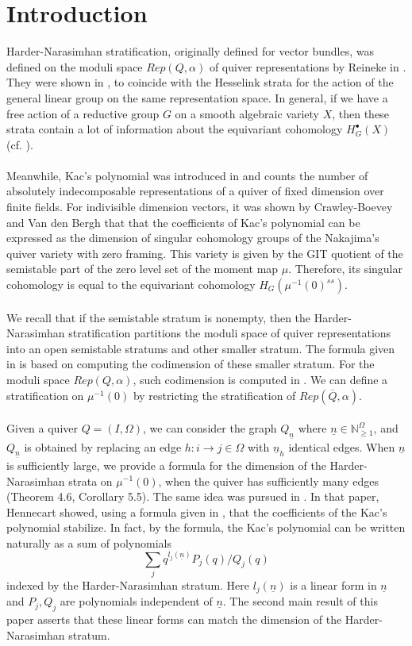 \documentclass[12pt]{amsart}
\theoremstyle{plain}
\theoremstyle{definition}
\theoremstyle{remark}
\begin{document}
\section{Introduction}
\hspace{-12pt}Harder-Narasimhan stratification, originally defined for vector bundles, was defined on the moduli space $Rep(Q,\alpha)$ of quiver representations by Reineke in \cite{reineke2003hn}. They were shown in \cite{hoskins2014stratifications},\cite{hoskins2018stratifications} to coincide with the Hesselink strata for the action of the general linear group on the same representation space. In general, if we have a free action of a reductive group $G$ on a smooth algebraic variety $X$, then these strata contain a lot of information about the equivariant cohomology $H_G^{\bullet}(X)$ (cf. \cite{kirwan1984cohomology}). 
\\~\\ Meanwhile, Kac's polynomial was introduced in \cite{kac1983root} and counts the number of absolutely indecomposable representations of a quiver of fixed dimension over finite fields. For indivisible dimension vectors, it was shown by Crawley-Boevey and Van den Bergh that \cite{crawley2004absolutely} that the coefficients of Kac's polynomial can be expressed as the dimension of singular cohomology groups of the Nakajima's quiver variety with zero framing. This variety is given by the GIT quotient of the semistable part of the zero level set of the moment map $\mu$. Therefore, its singular cohomology is equal to the equivariant cohomology $H_G(\mu^{-1}(0)^{ss})$. 
\\~\\ We recall that if the semistable stratum is nonempty, then the Harder-Narasimhan stratification partitions the moduli space of quiver representations into an open semistable stratums and other smaller stratum. The formula given in \cite{kirwan1984cohomology} is based on computing the codimension of these smaller stratum. For the moduli space $Rep(Q,\alpha)$, such codimension is computed in \cite{reineke2003hn}. We can define a stratification on $\mu^{-1}(0)$ by restricting the stratification of $Rep(\overline{Q},\alpha)$.
\\~\\Given a quiver $Q=(I,\Omega)$, we can consider the graph $Q_{\underline{n}}$ where $\underline{n}\in\mathbb N_{\geq 1}^{\Omega}$, and $Q_{\underline{n}}$ is obtained by replacing an edge $h:i\to j\in\Omega$ with $\underline{n}_h$ identical edges. When $\underline{n}$ is sufficiently large, we provide a formula for the dimension of the Harder-Narasimhan strata on $\mu^{-1}(0)$, when the quiver has sufficiently many edges (Theorem 4.6, Corollary 5.5). The same idea was pursued in \cite{hennecart2021asymptotic}. In that paper, Hennecart showed, using a formula given in \cite{hua2000counting}, that the coefficients of the Kac's polynomial stabilize. In fact, by the formula, the Kac's polynomial can be written naturally as a sum of polynomials $$\sum_jq^{l_j(\underline{n})}P_j(q)/Q_j(q)$$ indexed by the Harder-Narasimhan stratum. Here $l_j(\underline{n})$ is a linear form in $\underline{n}$ and $P_j,Q_j$ are polynomials independent of $\underline{n}$. The second main result of this paper asserts that these linear forms can match the dimension of the Harder-Narasimhan stratum. 
\end{document}
